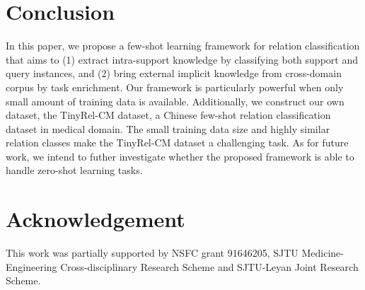\section{Conclusion}
In this paper, we propose a few-shot learning framework for relation classification that aims to (1) extract intra-support knowledge by classifying both support and query instances, and (2) bring external implicit knowledge from cross-domain corpus by task enrichment.
Our framework is particularly powerful when only small amount of training data is available. 
Additionally, we construct our own dataset, the TinyRel-CM dataset, a Chinese few-shot relation classification dataset in medical domain. The small training data size and highly similar 
relation classes make the TinyRel-CM dataset a challenging task.
As for future work, we intend to futher investigate whether the proposed framework is able to handle zero-shot learning tasks.

\section*{Acknowledgement}
This work was partially supported by NSFC grant 91646205, SJTU Medicine-Engineering Cross-disciplinary Research Scheme and SJTU-Leyan Joint Research Scheme.

